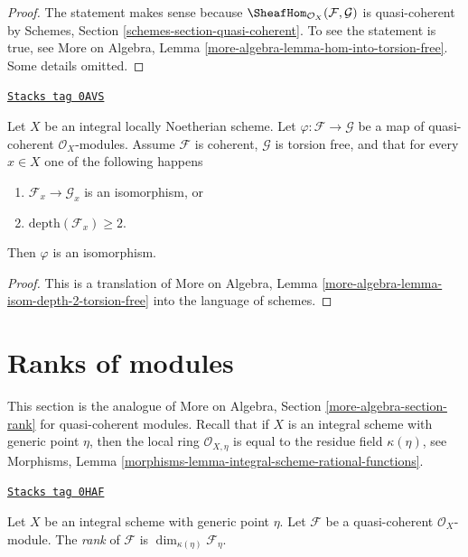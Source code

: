 \begin{proof}
The statement makes sense because
$\SheafHom_{\mathcal{O}_X}(\mathcal{F}, \mathcal{G})$
is quasi-coherent by Schemes, Section \ref{schemes-section-quasi-coherent}.
To see the statement is true, see
More on Algebra, Lemma \ref{more-algebra-lemma-hom-into-torsion-free}.
Some details omitted.
\end{proof}

\begin{lemma}
\label{divisors-lemma-isom-depth-2-torsion-free}
\href{https://stacks.math.columbia.edu/tag/0AVS}{\texttt{Stacks tag 0AVS}}

Let $X$ be an integral locally Noetherian scheme. Let
$\varphi : \mathcal{F} \to \mathcal{G}$ be a map of
quasi-coherent $\mathcal{O}_X$-modules. Assume $\mathcal{F}$ is coherent,
$\mathcal{G}$ is torsion free, and that for every $x \in X$ one of the
following happens
\begin{enumerate}
\item $\mathcal{F}_x \to \mathcal{G}_x$ is an isomorphism, or
\item $\text{depth}(\mathcal{F}_x) \geq 2$.
\end{enumerate}
Then $\varphi$ is an isomorphism.
\end{lemma}

\begin{proof}
This is a translation of More on Algebra, Lemma
\ref{more-algebra-lemma-isom-depth-2-torsion-free}
into the language of schemes.
\end{proof}

\section{Ranks of modules}
\label{divisors-section-rank}
This section is the analogue of
More on Algebra, Section \ref{more-algebra-section-rank}
for quasi-coherent modules.
Recall that if $X$ is an integral scheme with generic point $\eta$,
then the local ring $\mathcal{O}_{X, \eta}$ is equal to the
residue field $\kappa(\eta)$, see
Morphisms, Lemma \ref{morphisms-lemma-integral-scheme-rational-functions}.

\begin{definition}[Rank]
\label{divisors-definition-rank}
\href{https://stacks.math.columbia.edu/tag/0HAF}{\texttt{Stacks tag 0HAF}}

Let $X$ be an integral scheme with generic point $\eta$.
Let $\mathcal{F}$ be a quasi-coherent $\mathcal{O}_X$-module.
The {\it rank} of $\mathcal{F}$ is $\dim_{\kappa(\eta)} \mathcal{F}_\eta$.
\end{definition}

